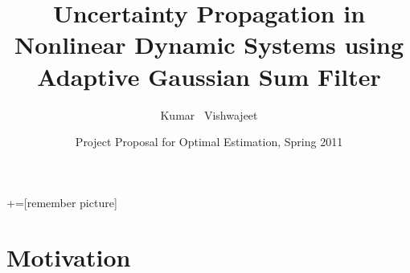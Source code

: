 \documentclass{beamer}
\title[Title] %
{Uncertainty Propagation in Nonlinear Dynamic Systems using Adaptive Gaussian Sum Filter}
\author
{Kumar ~Vishwajeet}
\institute
{
  Department of Mechanical \& Aerospace Engineering\\
  University at Buffalo
}
\date[CFP 2011] %
{Project Proposal for Optimal Estimation, Spring 2011}
\begin{document}
+=[remember picture]

\begin{frame}
  \titlepage
\end{frame}






\section{Motivation}

\end{document}
